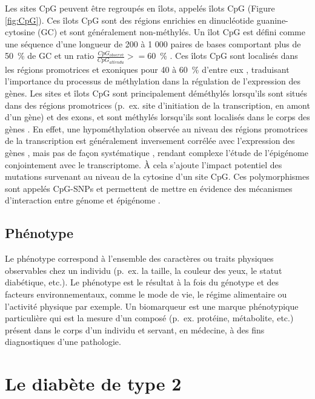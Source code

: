 \documentclass[11pt,a4paper,notrimn]{krantz}
\theoremstyle{definition}
\theoremstyle{definition}
\theoremstyle{remark}
\begin{document}
Les sites CpG peuvent être regroupés en îlots, appelés îlots CpG
\citep{deaton_cpg_2011} (Figure \ref{fig:CpG}). Ces îlots CpG sont des
régions enrichies en dinucléotide guanine-cytosine (GC) et sont
généralement non-méthylés. Un îlot CpG est défini comme une séquence
d'une longueur de 200 à 1 000 paires de bases comportant plus de 50~\%
de GC et un ratio \(\frac{CpG_{observé}}{CpG_{attendu}}>=60\)~\%
\citep{antequera_structure_2003, gardiner-garden_cpg_1987}. Ces îlots
CpG sont localisés dans les régions promotrices et exoniques pour 40 à
60~\% d'entre eux \citep{larsen_cpg_1992, saxonov_genome-wide_2006},
traduisant l'importance du processus de méthylation dans la régulation
de l'expression des gènes. Les sites et îlots CpG sont principalement
déméthylés lorsqu'ils sont situés dans des régions promotrices (p.~ex.
site d'initiation de la transcription, en amont d'un gène) et des exons,
et sont méthylés lorsqu'ils sont localisés dans le corps des gènes
\citep{ball_targeted_2009, hellman_gene_2007, jones_dna_1999}. En effet,
une hypométhylation observée au niveau des régions promotrices de la
transcription est généralement inversement corrélée avec l'expression
des gènes \citep{schultz_human_2015, wagner_relationship_2014}, mais pas
de façon systématique \citep{moarii_changes_2015}, rendant complexe
l'étude de l'épigénome conjointement avec le transcriptome. À cela
s'ajoute l'impact potentiel des mutations survenant au niveau de la
cytosine d'un site CpG. Ces polymorphismes sont appelés CpG-SNPs et
permettent de mettre en évidence des mécanismes d'interaction entre
génome et épigénome \citep{dayeh_identification_2013, zhi_snps_2013}.

\subsection{Phénotype}\label{phenotype}

Le phénotype correspond à l'ensemble des caractères ou traits physiques
observables chez un individu (p.~ex. la taille, la couleur des yeux, le
statut diabétique, etc.). Le phénotype est le résultat à la fois du
génotype et des facteurs environnementaux, comme le mode de vie, le
régime alimentaire ou l'activité physique par exemple. Un biomarqueur
est une marque phénotypique particulière qui est la mesure d'un composé
(p.~ex. protéine, métabolite, etc.) présent dans le corps d'un individu
et servant, en médecine, à des fins diagnostiques d'une pathologie.

\section{Le diabète de type 2}\label{le-diabete-de-type-2}
\end{document}
